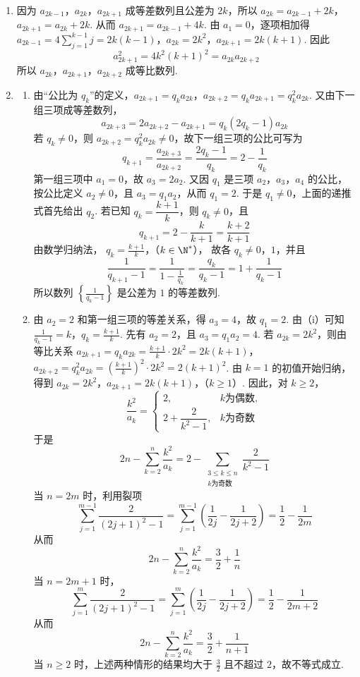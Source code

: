 \begin{solution}
\begin{enumerate}
\item 因为 \(a_{2k-1}\)，\(a_{2k}\)，\(a_{2k+1}\) 成等差数列且公差为 \(2k\)，所以
\(a_{2k}=a_{2k-1}+2k\)，\(a_{2k+1}=a_{2k}+2k\).
从而 \(a_{2k+1}=a_{2k-1}+4k\). 由 \(a_1=0\)，逐项相加得
\(a_{2k-1}=4\sum_{j=1}^{k-1}j=2k(k-1)\)，\(a_{2k}=2k^2\)，\(a_{2k+1}=2k(k+1)\).
因此
\[
a_{2k+1}^{2}=4k^2(k+1)^2=a_{2k}a_{2k+2}
\]
所以 \(a_{2k}\)，\(a_{2k+1}\)，\(a_{2k+2}\) 成等比数列.
\item
\begin{enumerate}
\item 由“公比为 \(q_k\)”的定义，\(a_{2k+1}=q_ka_{2k}\)，\(a_{2k+2}=q_ka_{2k+1}=q_k^2a_{2k}\). 又由下一组三项成等差数列，
\[
a_{2k+3}=2a_{2k+2}-a_{2k+1}=q_k(2q_k-1)a_{2k}
\]
若 \(q_k\ne0\)，则 \(a_{2k+2}=q_k^2a_{2k}\ne0\)，故下一组三项的公比可写为
\[
q_{k+1}=\frac{a_{2k+3}}{a_{2k+2}}=\frac{2q_k-1}{q_k}=2-\frac{1}{q_k}
\]
第一组三项中 \(a_1=0\)，故 \(a_3=2a_2\). 又因 \(q_1\) 是三项 \(a_2\)，\(a_3\)，\(a_4\) 的公比，按公比定义 \(a_2\ne0\)，且 \(a_3=q_1a_2\)，从而 \(q_1=2\). 于是 \(q_1\ne0\)，上面的递推式首先给出 \(q_2\). 若已知 \(q_k=\dfrac{k+1}{k}\)，则 \(q_k\ne0\)，且
\[
q_{k+1}=2-\frac{k}{k+1}=\frac{k+2}{k+1}
\]
由数学归纳法，
\(q_k=\frac{k+1}{k}\)，（\(k\in\N^*\)），
故各 \(q_k\ne0\)，\(1\)，并且
\[
\frac{1}{q_{k+1}-1}=\frac{1}{1-\frac{1}{q_k}}=\frac{q_k}{q_k-1}=1+\frac{1}{q_k-1}
\]
所以数列 \(\left\{\frac{1}{q_k-1}\right\}\) 是公差为 \(1\) 的等差数列.
\item 由 \(a_2=2\) 和第一组三项的等差关系，得 \(a_3=4\)，故 \(q_1=2\). 由（i）可知
\(\frac{1}{q_k-1}=k\)，\(q_k=\frac{k+1}{k}\).
先有 \(a_2=2\)，且 \(a_3=q_1a_2=4\). 若 \(a_{2k}=2k^2\)，则由等比关系
\(a_{2k+1}=q_ka_{2k}=\frac{k+1}{k}\cdot2k^2=2k(k+1)\)，\(a_{2k+2}=q_k^2a_{2k}=\left(\frac{k+1}{k}\right)^2\cdot2k^2=2(k+1)^2\).
由 \(k=1\) 的初值开始归纳，得到
\(a_{2k}=2k^2\)，\(a_{2k+1}=2k(k+1)\)，（\(k\geqslant1\)）.
因此，对 \(k\geqslant2\)，
\[
\frac{k^2}{a_k}=\begin{cases}
2,&k\text{为偶数},\\
2+\dfrac{2}{k^2-1},&k\text{为奇数}
\end{cases}
\]
于是
\[
2n-\sum_{k=2}^{n}\frac{k^2}{a_k}=2-\sum_{\substack{3\leqslant k\leqslant n\\ k\text{为奇数}}}\frac{2}{k^2-1}
\]
当 \(n=2m\) 时，利用裂项
\[
\sum_{j=1}^{m-1}\frac{2}{(2j+1)^2-1}=\sum_{j=1}^{m-1}\left(\frac{1}{2j}-\frac{1}{2j+2}\right)=\frac{1}{2}-\frac{1}{2m}
\]
从而
\[
2n-\sum_{k=2}^{n}\frac{k^2}{a_k}=\frac{3}{2}+\frac{1}{n}
\]
当 \(n=2m+1\) 时，
\[
\sum_{j=1}^{m}\frac{2}{(2j+1)^2-1}=\sum_{j=1}^{m}\left(\frac{1}{2j}-\frac{1}{2j+2}\right)=\frac{1}{2}-\frac{1}{2m+2}
\]
从而
\[
2n-\sum_{k=2}^{n}\frac{k^2}{a_k}=\frac{3}{2}+\frac{1}{n+1}
\]
当 \(n\geqslant2\) 时，上述两种情形的结果均大于 \(\frac{3}{2}\) 且不超过 \(2\)，故不等式成立.
\end{enumerate}
\end{enumerate}
\end{solution}
